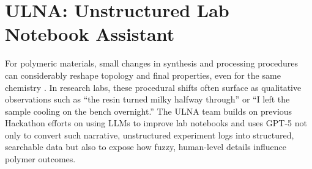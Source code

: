 




\section{ULNA: Unstructured Lab Notebook Assistant}



For polymeric materials, small changes in synthesis and processing procedures can considerably reshape topology and final properties, even for the same chemistry \cite{rubinstein2003polymer}. In research labs, these procedural shifts often surface as qualitative observations such as “the resin turned milky halfway through” or “I left the sample cooling on the bench overnight.” The ULNA team builds on previous Hackathon efforts on using LLMs to improve lab notebooks \cite{jablonka202314, zimmermann202534} and uses GPT-5 not only to convert such narrative, unstructured experiment logs into structured, searchable data but also to expose how fuzzy, human-level details influence polymer outcomes.


